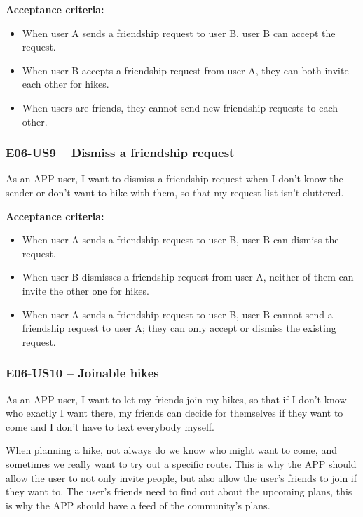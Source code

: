 \textbf{Acceptance criteria:}
\begin{itemize}
    \item When user A sends a friendship request to user B, user B can accept the request.
    \item When user B accepts a friendship request from user A, they can both invite each other for hikes.
    \item When users are friends, they cannot send new friendship requests to each other.
\end{itemize}


\subsubsection*{E06-US9 -- Dismiss a friendship request}
As an APP user, I want to dismiss a friendship request when I don't know the sender or don't want to hike with them, so that my request list isn't cluttered.

\textbf{Acceptance criteria:} 
\begin{itemize}
    \item When user A sends a friendship request to user B, user B can dismiss the request.
    \item When user B dismisses a friendship request from user A, neither of them can invite the other one for hikes.
    \item When user A sends a friendship request to user B, user B cannot send a friendship request to user A; they can only accept or dismiss the existing request.
\end{itemize}



\subsubsection*{E06-US10 -- Joinable hikes}
As an APP user, I want to let my friends join my hikes, so that if I don't know who exactly I want there, my friends can decide for themselves if they want to come and I don't have to text everybody myself.

When planning a hike, not always do we know who might want to come, and sometimes we really want to try out a specific route.
This is why the APP should allow the user to not only invite people, but also allow the user's friends to join if they want to.
The user's friends need to find out about the upcoming plans, this is why the APP should have a feed of the community's plans.

